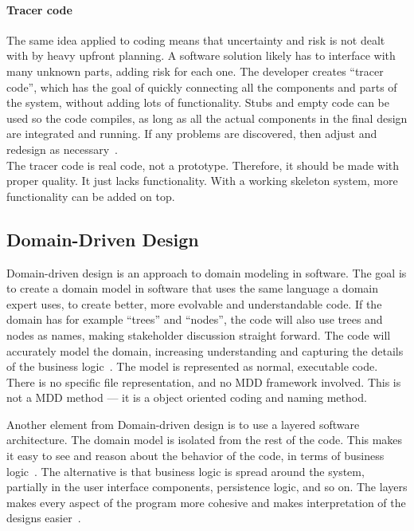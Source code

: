 \paragraph{Tracer code}
The same idea applied to coding means that uncertainty and risk is not dealt with by heavy upfront planning.
A software solution likely has to interface with many unknown parts, adding risk for each one.
The developer creates ``tracer code'', which has the goal of quickly connecting all the components and parts of the system, without adding lots of functionality.
Stubs and empty code can be used so the code compiles, as long as all the actual components in the final design are integrated and running.
If any problems are discovered, then adjust and redesign as necessary~\cite{huntPragmaticProgrammerJourneyman2000}.\\

The tracer code is real code, not a prototype.
Therefore, it should be made with proper quality.
It just lacks functionality.
With a working skeleton system, more functionality can be added on top.


\subsection{Domain-Driven Design}

Domain-driven design is an approach to domain modeling in software.
The goal is to create a domain model in software that uses the same language a domain expert uses, to create better, more evolvable and understandable code.
If the domain has for example ``trees'' and ``nodes'', the code will also use trees and nodes as names, making stakeholder discussion straight forward.
The code will accurately model the domain, increasing understanding and capturing the details of the business logic~\cite{evansDomaindrivenDesignTackling2004}.
The model is represented as normal, executable code.
There is no specific file representation, and no \acrshort{MDD} framework involved.
This is not a \acrshort{MDD} method --- it is a object oriented coding and naming method.\

Another element from Domain-driven design is to use a layered software architecture.
The domain model is isolated from the rest of the code.
This makes it easy to see and reason about the behavior of the code, in terms of business logic~\cite[p.~69]{evansDomaindrivenDesignTackling2004}.
The alternative is that business logic is spread around the system, partially in the user interface components, persistence logic, and so on.
The layers makes every aspect of the program more cohesive and makes interpretation of the designs easier~\cite[p.~69]{evansDomaindrivenDesignTackling2004}.\\

